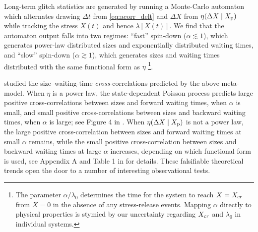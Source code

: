 Long-term glitch statistics are generated by running a Monte-Carlo automaton which alternates drawing $\Delta t$ from \eqref{eq:acorr_delt} and $\Delta X$ from $\eta(\Delta X \mid X_{\textrm{p}})$ while tracking the stress $X(t)$ and hence $\lambda[X(t)]$. We find that the automaton output falls into two regimes: ``fast'' spin-down ($\alpha \lesssim 1$), which generates power-law distributed sizes and exponentially distributed waiting times, and ``slow'' spin-down ($\alpha \gtrsim 1$), which generates sizes and waiting times distributed with the same functional form as $\eta$ \citep{Fulgenzi2017, Carlin2019quasi}\footnote{The parameter $\alpha/\lambda_0$ determines the time for the system to reach $X=X_{\rm cr}$ from $X=0$ in the absence of any stress-release events. Mapping $\alpha$ directly to physical properties is stymied by our uncertainty regarding $X_{\textrm cr}$ and $\lambda_0$ in individual systems.}. 

\citet{Melatos2018} studied the size--waiting-time \emph{cross}-correlations predicted by the above meta-model. When $\eta$ is a power law, the state-dependent Poisson process predicts large positive cross-correlations between sizes and forward waiting times, when $\alpha$ is small, and small positive cross-correlations between sizes and backward waiting times, when $\alpha$ is large; see Figure 4 in \citet{Melatos2018}. When $\eta(\Delta X \mid X_{\textrm{p}})$ is not a power law, the large positive cross-correlation between sizes and forward waiting times at small $\alpha$ remains, while the small positive cross-correlation between sizes and backward waiting times at large $\alpha$ increases, depending on which functional form is used, see Appendix A and Table 1 in \citet{Carlin2019quasi} for details. These falsifiable theoretical trends open the door to a number of interesting observational tests.

